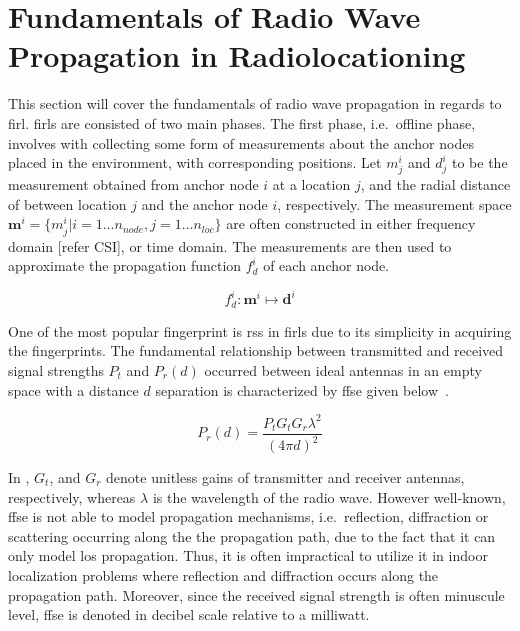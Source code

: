 \section{Fundamentals of Radio Wave Propagation in Radiolocationing}
\label{sec:fundamentals}
    This section will cover the fundamentals of radio wave propagation in regards to \gls{firl}.
    \Gls{firl}s are consisted of two main phases.
    The first phase, i.e.\ offline phase,  involves with collecting some form of measurements about the anchor nodes placed in the environment, with corresponding positions.
    Let $m^i_j$ and $d^i_j$ to be the measurement obtained from anchor node $i$ at a location $j$, and the radial distance of between location $j$ and the anchor node $i$, respectively.
    The measurement space $\bm{m}^i=\{m^i_j | i=1 \ldots n_{node}, j=1 \ldots n_{loc}\}$ are often constructed in either frequency domain [refer CSI], or time domain.
    The measurements are then used to approximate the propagation function $f^i_d$ of each anchor node.

    \begin{equation}
        f^i_d: \bm{m}^i \mapsto \bm{d}^i
    \end{equation}

    One of the most popular fingerprint is \gls{rss} in \gls{firl}s due to its simplicity in acquiring the fingerprints.
    The fundamental relationship between transmitted and received signal strengths $P_t$ and $P_r(d)$ occurred between ideal antennas in an empty space with a distance $d$ separation is characterized by \gls{ffse} given below~\cite{friis1946note}.

    \begin{equation}
        \label{eq:friisWatts}
            P_r(d) = \dfrac{P_t  G_t  G_r \lambda^2}{{\left(4 \pi d\right)}^2}
    \end{equation}

    In , $G_t$, and $G_r$ denote unitless gains of transmitter and receiver antennas, respectively, whereas $\lambda$ is the wavelength of the radio wave.
    However well-known, \gls{ffse} is not able to model propagation mechanisms, i.e.\ reflection, diffraction or scattering occurring along the the propagation path, due to the fact that it can only model \gls{los} propagation.
    Thus, it is often impractical to utilize it in indoor localization problems where reflection and diffraction occurs along the propagation path.
    Moreover, since the received signal strength is often minuscule level, \gls{ffse} is denoted in decibel scale relative to a milliwatt.

